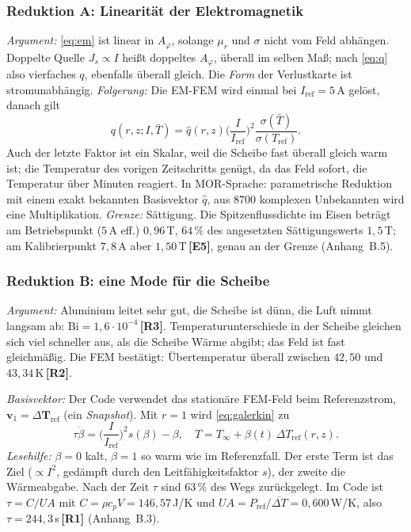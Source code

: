 \documentclass[a4paper, 10pt, conference]{ieeeconf}
\theoremstyle{remark}
\newcommand{\src}[1]{\,\textbf{[#1]}}
\begin{document}
\subsubsection{Reduktion A: Linearität der Elektromagnetik}
\emph{Argument:} \eqref{eq:em} ist linear in $A_\varphi$, solange $\mu_r$
und $\sigma$ nicht vom Feld abhängen. Doppelte Quelle $J_s\propto I$ heißt
doppeltes $A_\varphi$, überall im selben Maß; nach \eqref{eq:q} also
vierfaches $q$, ebenfalls überall gleich. Die \emph{Form} der Verlustkarte
ist stromunabhängig. \emph{Folgerung:} Die EM-FEM wird einmal bei
$I_{\mathrm{ref}}=5\,$A gelöst, danach gilt
\begin{equation}
  q(r,z;I,\bar T)=\hat q(r,z)\Big(\frac{I}{I_{\mathrm{ref}}}\Big)^{\!2}
  \frac{\sigma(\bar T)}{\sigma(T_{\mathrm{ref}})} .
  \label{eq:scale}
\end{equation}
Auch der letzte Faktor ist ein Skalar, weil die Scheibe fast überall gleich
warm ist; die Temperatur des vorigen Zeitschritts genügt, da das Feld sofort,
die Temperatur über Minuten reagiert. In MOR-Sprache: parametrische
Reduktion mit einem exakt bekannten Basisvektor $\hat q$, aus $8700$
komplexen Unbekannten wird eine Multiplikation. \emph{Grenze:} Sättigung.
Die Spitzenflussdichte im Eisen beträgt am Betriebspunkt ($5\,$A eff.)
$0{,}96\,$T, $64\,\%$ des angesetzten Sättigungswerts $1{,}5\,$T; am
Kalibrierpunkt $7{,}8\,$A aber $1{,}50\,$T\src{E5}, genau an der Grenze
(Anhang~B.5).

\subsubsection{Reduktion B: eine Mode für die Scheibe}
\emph{Argument:} Aluminium leitet sehr gut, die Scheibe ist dünn, die Luft
nimmt langsam ab: $\mathrm{Bi}=1{,}6\cdot10^{-4}$\src{R3}.
Temperaturunterschiede in der Scheibe gleichen sich viel schneller aus, als
die Scheibe Wärme abgibt; das Feld ist fast gleichmäßig. Die FEM bestätigt:
Übertemperatur überall zwischen $42{,}50$ und $43{,}34\,$K\src{R2}.

\emph{Basisvektor:} Der Code verwendet das stationäre FEM-Feld beim
Referenzstrom, $\mathbf v_1=\Delta\mathbf T_{\mathrm{ref}}$ (ein
\emph{Snapshot}). Mit $r=1$ wird \eqref{eq:galerkin} zu
\begin{equation}
  \tau\dot\beta=\Big(\frac{I}{I_{\mathrm{ref}}}\Big)^{\!2}s(\beta)-\beta,
  \quad T=T_\infty+\beta(t)\,\Delta T_{\mathrm{ref}}(r,z).
  \label{eq:rom1}
\end{equation}
\emph{Lesehilfe:} $\beta=0$ kalt, $\beta=1$ so warm wie im
Referenzfall. Der erste Term ist das Ziel ($\propto I^2$, gedämpft durch den
Leitfähigkeitsfaktor $s$), der zweite die Wärmeabgabe. Nach der Zeit $\tau$
sind $63\,\%$ des Wegs zurückgelegt. Im Code ist $\tau=C/UA$ mit
$C=\rho c_pV=146{,}57\,$J/K und $UA=P_{\mathrm{ref}}/\overline{\Delta
T}=0{,}600\,$W/K, also $\tau=244{,}3\,$s\src{R1} (Anhang~B.3).
\end{document}
